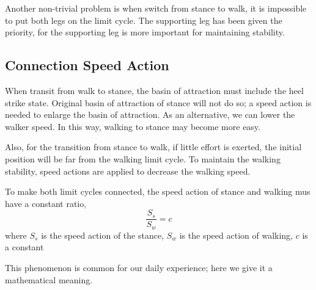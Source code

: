 Another non-trivial problem is when switch from stance to walk, it is impossible to put both legs on the limit cycle.
The supporting leg has been given the priority, for the supporting leg is more important for maintaining stability.





\subsection{Connection Speed Action}
When transit from walk to stance, the basin of attraction must include the heel strike state.
Original basin of attraction of stance will not do so; a speed action is needed to enlarge the basin of attraction.
As an alternative, we can lower the walker speed.
In this way, walking to stance may become more easy.

Also, for the transition from stance to walk, if little effort is exerted, the initial position will be far from the walking limit cycle.
To maintain the walking stability, speed actions are applied to decrease the walking speed.

To make both limit cycles connected, the speed action of stance and walking mus have a constant ratio,
\[
\frac{S_s}{S_w}=c
\]
where $S_s$ is the speed action of the stance, $S_w$ is the speed action of walking,
$c$ is a constant

This phenomenon is common for our daily experience; here we give it a mathematical meaning.

























